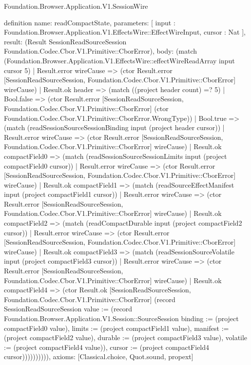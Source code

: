 \begin{lexlean}{Foundation.Browser.Application.V1.SessionWire}
\begin{semanticmodule}
definition{
  name: readCompactState,
  parameters: [
    input : Foundation.Browser.Application.V1.EffectsWire::EffectWireInput,
    cursor : Nat
  ],
  result: (Result SessionReadSourceSession Foundation.Codec.Cbor.V1.Primitive::CborError),
  body: (match (Foundation.Browser.Application.V1.EffectsWire::effectWireReadArray input cursor 5)
    | Result.error wireCause => (ctor Result.error [SessionReadSourceSession, Foundation.Codec.Cbor.V1.Primitive::CborError] wireCause)
    | Result.ok header => (match ((project header count) =? 5)
      | Bool.false => (ctor Result.error [SessionReadSourceSession, Foundation.Codec.Cbor.V1.Primitive::CborError] (ctor Foundation.Codec.Cbor.V1.Primitive::CborError.WrongType))
      | Bool.true => (match (readSessionSourceSessionBinding input (project header cursor))
        | Result.error wireCause => (ctor Result.error [SessionReadSourceSession, Foundation.Codec.Cbor.V1.Primitive::CborError] wireCause)
        | Result.ok compactField0 => (match (readSessionSourceSessionLimits input (project compactField0 cursor))
          | Result.error wireCause => (ctor Result.error [SessionReadSourceSession, Foundation.Codec.Cbor.V1.Primitive::CborError] wireCause)
          | Result.ok compactField1 => (match (readSourceEffectManifest input (project compactField1 cursor))
            | Result.error wireCause => (ctor Result.error [SessionReadSourceSession, Foundation.Codec.Cbor.V1.Primitive::CborError] wireCause)
            | Result.ok compactField2 => (match (readCompactDurable input (project compactField2 cursor))
              | Result.error wireCause => (ctor Result.error [SessionReadSourceSession, Foundation.Codec.Cbor.V1.Primitive::CborError] wireCause)
              | Result.ok compactField3 => (match (readSessionSourceVolatile input (project compactField3 cursor))
                | Result.error wireCause => (ctor Result.error [SessionReadSourceSession, Foundation.Codec.Cbor.V1.Primitive::CborError] wireCause)
                | Result.ok compactField4 => (ctor Result.ok [SessionReadSourceSession, Foundation.Codec.Cbor.V1.Primitive::CborError] (record SessionReadSourceSession {value := (record Foundation.Browser.Application.V1.Session::SourceSession {binding := (project compactField0 value), limits := (project compactField1 value), manifest := (project compactField2 value), durable := (project compactField3 value), volatile := (project compactField4 value)}), cursor := (project compactField4 cursor)}))))))))),
  axioms: [Classical.choice, Quot.sound, propext]
}


\end{semanticmodule}
\end{lexlean}
